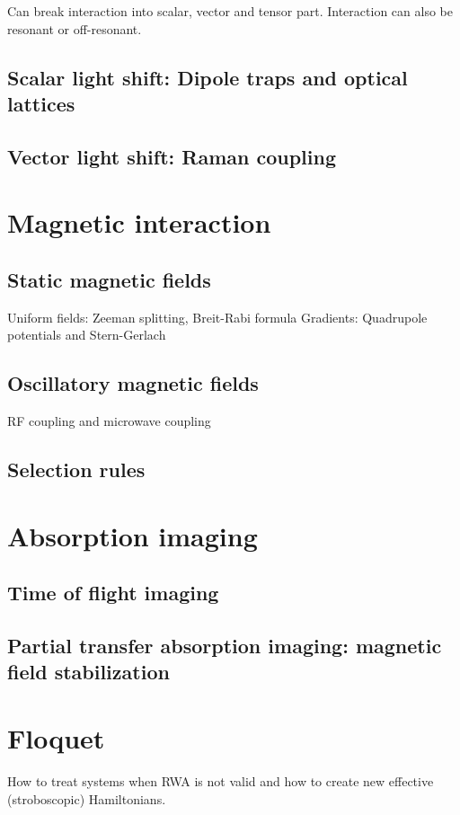 Can break interaction into scalar, vector and tensor part. Interaction can also be resonant or off-resonant.


\subsection{Scalar light shift: Dipole traps and optical lattices}

\subsection{Vector light shift: Raman coupling}

\section{Magnetic interaction}
\subsection{Static magnetic fields}
Uniform fields: Zeeman splitting, Breit-Rabi formula
Gradients: Quadrupole potentials and Stern-Gerlach

\subsection{Oscillatory magnetic fields}
RF coupling and microwave coupling

\subsection{Selection rules}

\section{Absorption imaging}
\subsection{Time of flight imaging}
\subsection{Partial transfer absorption imaging: magnetic field stabilization}

\section{Floquet}
How to treat systems when RWA is not valid and how to create new effective (stroboscopic) Hamiltonians.